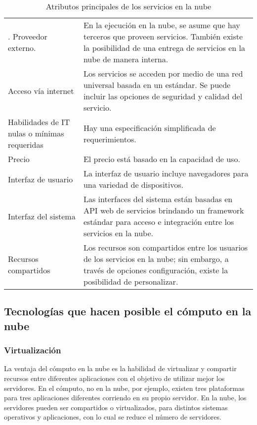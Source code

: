 \begin{table}
\centering
\caption{Atributos principales de los servicios en la nube \label{\detokenize{chapter_one/cloud_computing:key-cloud-services-attr}}}
\begin{tabulary}{\linewidth}[t]{|T|T|}
\hline
{}\relax &\relax \\
\hline
{}. Proveedor externo.
&
En la ejecución en la nube, se asume que hay terceros que proveen servicios. También existe la posibilidad de una entrega de servicios en la nube de manera interna.
\\
\hline
Acceso vía internet
&
Los servicios se acceden por medio de una red universal basada en un estándar. Se puede incluir las opciones de seguridad y calidad del servicio.
\\
\hline
Habilidades de IT nulas o mínimas requeridas
&
Hay una especificación simplificada de requerimientos.
\\
\hline
Precio
&
El precio está basado en la capacidad de uso.
\\
\hline
Interfaz de usuario
&
La interfaz de usuario incluye navegadores para una variedad de dispositivos.
\\
\hline
Interfaz del sistema
&
Las interfaces del sistema están basadas en API web de servicios brindando un framework estándar para acceso e integración entre los servicios en la nube.
\\
\hline
Recursos compartidos
&
Los recursos son compartidos entre los usuarios de los servicios en la nube; sin embargo, a través de opciones configuración, existe la posibilidad de personalizar.
\\
\hline
\end{tabulary}
\end{table}


\subsection{Tecnologías que hacen posible el cómputo en la nube}
\label{\detokenize{chapter_one/cloud_computing:tecnologias-que-hacen-posible-el-computo-en-la-nube}}
\subsubsection{Virtualización}
\label{\detokenize{chapter_one/cloud_computing:virtualizacion}}
La ventaja del cómputo en la nube es la habilidad de virtualizar y compartir
recursos entre diferentes aplicaciones con el objetivo de utilizar mejor los
servidores. En el cómputo, no en la nube, por ejemplo, existen tres plataformas para
tres aplicaciones diferentes corriendo en su propio servidor. En la nube,
los servidores pueden ser compartidos o virtualizados, para distintos sistemas
operativos y aplicaciones, con lo cual se reduce el número de servidores.


